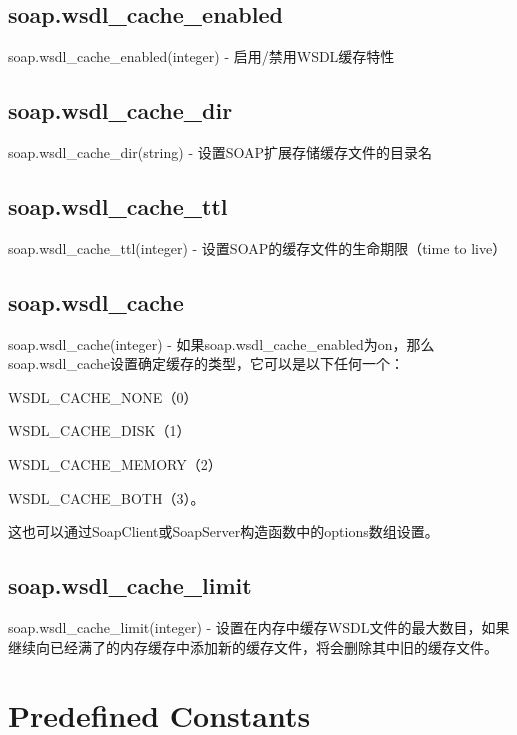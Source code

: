 \subsection{soap.wsdl\_cache\_enabled}

soap.wsdl\_cache\_enabled(integer) - 启用/禁用WSDL缓存特性

\subsection{soap.wsdl\_cache\_dir}

soap.wsdl\_cache\_dir(string) - 设置SOAP扩展存储缓存文件的目录名

\subsection{soap.wsdl\_cache\_ttl}

soap.wsdl\_cache\_ttl(integer) - 设置SOAP的缓存文件的生命期限（time to live）

\subsection{soap.wsdl\_cache}

soap.wsdl\_cache(integer) - 如果soap.wsdl\_cache\_enabled为on，那么soap.wsdl\_cache设置确定缓存的类型，它可以是以下任何一个：

\begin{compactitem}
\item WSDL\_CACHE\_NONE（0）
\item WSDL\_CACHE\_DISK（1）
\item WSDL\_CACHE\_MEMORY（2）
\item WSDL\_CACHE\_BOTH（3）。
\end{compactitem}

这也可以通过SoapClient或SoapServer构造函数中的options数组设置。

\subsection{soap.wsdl\_cache\_limit}

soap.wsdl\_cache\_limit(integer) - 设置在内存中缓存WSDL文件的最大数目，如果继续向已经满了的内存缓存中添加新的缓存文件，将会删除其中旧的缓存文件。







\section{Predefined Constants}

